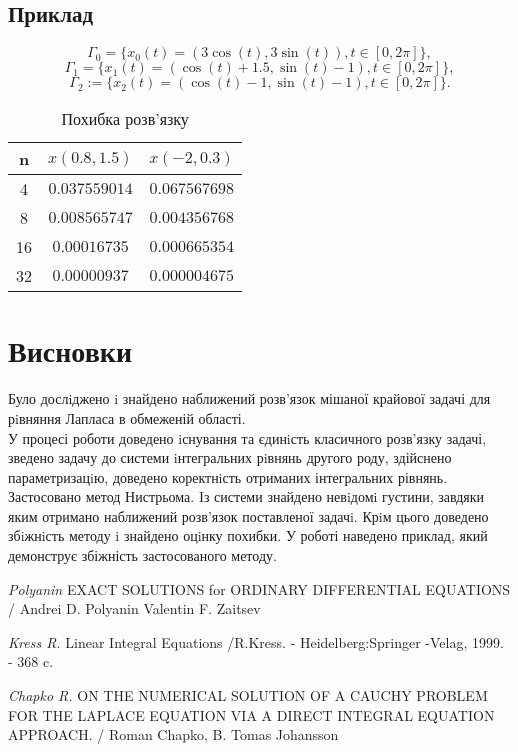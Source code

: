 \documentclass[a4 paper,12pt,ukrainian]{report}
\begin{document}
\section{Приклад}
\begin{equation*}
\Gamma_0 =\{x_0(t) = (3\cos(t),3\sin(t)), t \in [0,2\pi]\},
\end{equation*}
\begin{equation*}
\Gamma_1 =\{x_1(t) = (\cos(t)+1.5,\sin(t)-1), t \in [0,2\pi]\},
\end{equation*}
\begin{equation*}
\Gamma_2 :=\{x_2(t) = (\cos(t)-1,\sin(t)-1), t \in [0,2\pi]\}.
\end{equation*}
\begin{table}[h]
\caption{\label{tab:pr1}Похибка розв'язку}
\begin{center}
\begin{tabular}{|c|c|c|}
\hline
n & $x(0.8,1.5)$ & $x(-2,0.3)$\\
\hline
4 & $0.037559014$ & $0.067567698$\\
\hline
8 & $0.008565747$ & $0.004356768$\\
\hline
16 & $0.00016735$ & $0.000665354$\\
\hline
32 & $0.00000937$ & $0.000004675$\\
\hline
\end{tabular}
\end{center}
\end{table}
\chapter*{Висновки}
\hspace*{\parindent}Було дослiджено i знайдено наближений розв'язок мішаної крайової задачі для рiвняння Лапласа в обмеженій області.\\
\hspace*{\parindent}У процесі роботи доведено iснування та єдинiсть класичного розв’язку задачі, зведено задачу до системи iнтегральних рiвнянь другого роду, здійснено параметризацiю, доведено коректнiсть отриманих інтегральних рівнянь. Застосовано метод Нистрьома. Iз системи знайдено невiдомi густини, завдяки яким отримано наближений розв’язок поставленої задачi. Крiм цього доведено збiжнiсть методу i знайдено оцiнку похибки. У роботі наведено приклад, який демонструє збіжність застосованого методу.



\renewcommand{\bibname}{Список літератури}
\begin{thebibliography}{99}

\emph{Polyanin} EXACT SOLUTIONS for ORDINARY DIFFERENTIAL EQUATIONS / Andrei D. Polyanin Valentin F. Zaitsev

\emph{Kress R.} Linear Integral Equations /R.Kress. - Heidelberg:Springer -Velag, 1999. - 368 c.

\emph{Chapko R.} ON THE NUMERICAL SOLUTION OF A CAUCHY PROBLEM FOR THE LAPLACE EQUATION VIA A DIRECT INTEGRAL EQUATION APPROACH. / Roman Chapko, B. Tomas Johansson 

\end{thebibliography}
\end{document}
